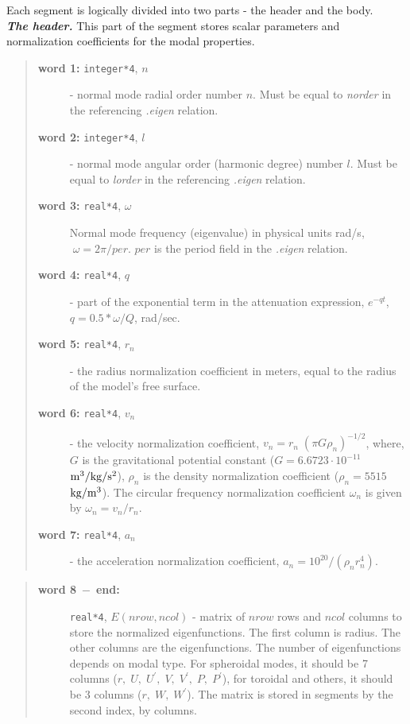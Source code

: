 Each segment is logically divided into two parts -  the header and the body. \\
{\bf \emph{The header.}} This part of the segment stores   scalar 
parameters  and normalization coefficients
for the modal properties.
\begin{quote}
\begin{description}
\item[{\bf word 1:} {\tt integer*4}, $n$] - normal mode radial order number $n$. Must
  be equal to {\it norder} in the referencing {\it .eigen} relation.
\item[{\bf word 2:} {\tt integer*4}, $l$] - normal mode angular order 
(harmonic degree) number $l$. Must
  be equal to {\it lorder} in the referencing {\it .eigen} relation.
\item[{\bf word 3:} {\tt real*4}, $\omega$] Normal mode frequency (eigenvalue) in
  physical units rad/s, \mbox{$\;\omega=2\pi/per$}. $per$ is the period field in the
  {\it .eigen} relation.
\item[{\bf word 4:} {\tt real*4}, $q$] - part of the exponential term in the
  attenuation
  expression, \mbox{$e^{-qt}$}, \mbox{$q=0.5*\omega/Q$}, rad/sec.
\item[{\bf word 5:} {\tt real*4}, $r_n$] - the radius normalization coefficient 
  in meters, equal to the radius of the model's free surface.
\item[{\bf word 6:} {\tt real*4}, $v_n$] - the velocity normalization 
  coefficient, $v_n=r_n\;(\pi G\rho_n)^{-1/2}$, where,
$G$ is the gravitational potential constant 
($G=6.6723\cdot 10^{-11}$ $\rm m^3/kg/s^2$),
$\rho_n$ is the density normalization coefficient ($\rho_n=5515$ $\rm kg/m^3$).
The circular frequency normalization coefficient $\omega_n$ is given by
$\omega_n=v_n/r_n$.
\item[{\bf word 7:} {\tt real*4}, $a_n$] - the acceleration normalization 
  coefficient, \mbox{$a_n=10^{20}/(\rho_n r_n^4)$}.
\end{description}
\end{quote}
%
%
\begin{quote}
\begin{description}
\item[{\bf word 8$\;-\;$end:}] {\tt real*4}, $E(nrow,ncol)$ - matrix 
  of $nrow$ rows and $ncol$ columns to store the normalized eigenfunctions. 
  The first column is radius. The other columns are the
  eigenfunctions.
  The number of eigenfunctions depends on modal type. For spheroidal
  modes, it should be 7 columns ($r,\;U,\;U^\prime,\;V,\; V^\prime,\;P,
  \;P^\prime$), for toroidal and others, it should be 3 columns ($r,\;W,\;W^\prime$).
  The matrix is stored in segments by the second index, by columns.
\end{description}
\end{quote}

